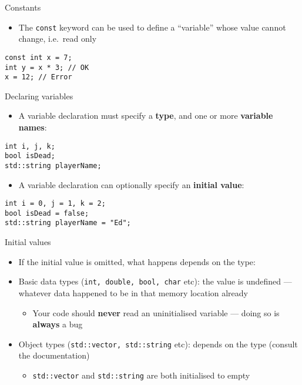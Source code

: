 \begin{frame}[fragile]{Constants}
	\begin{itemize}
		\item The \lstinline{const} keyword can be used to define a ``variable'' whose value cannot change, i.e.\ read only
	\end{itemize}
	\pause
	\begin{lstlisting}
const int x = 7;
int y = x * 3; // OK
x = 12; // Error
	\end{lstlisting}
\end{frame}

\begin{frame}[fragile]{Declaring variables}
	\begin{itemize}
		\item A variable declaration must specify a \textbf{type}, and one or more \textbf{variable names}:
	\end{itemize}
	\begin{lstlisting}
int i, j, k;
bool isDead;
std::string playerName;
	\end{lstlisting}
	\pause
	\begin{itemize}
		\item A variable declaration can optionally specify an \textbf{initial value}:
	\end{itemize}
	\begin{lstlisting}
int i = 0, j = 1, k = 2;
bool isDead = false;
std::string playerName = "Ed";
	\end{lstlisting}
\end{frame}

\begin{frame}[fragile]{Initial values}
	\begin{itemize}
		\item If the initial value is omitted, what happens depends on the type: \pause
		\item Basic data types (\lstinline{int, double, bool, char} etc): the value is undefined --- whatever data happened
		to be in that memory location already \pause
		\begin{itemize}
			\item Your code should \textbf{never} read an uninitialised variable --- doing so is \textbf{always} a bug \pause
		\end{itemize}
		\item Object types (\lstinline{std::vector, std::string} etc): depends on the type (consult the documentation) \pause
		\begin{itemize}
			\item \lstinline{std::vector} and \lstinline{std::string} are both initialised to empty
		\end{itemize}
	\end{itemize}
\end{frame}

